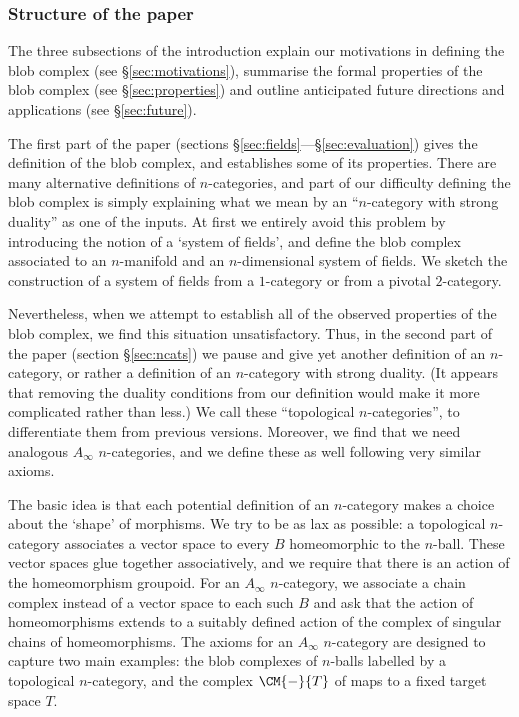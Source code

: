 \subsubsection{Structure of the paper}
The three subsections of the introduction explain our motivations in defining the blob complex (see \S \ref{sec:motivations}), summarise the formal properties of the blob complex (see \S \ref{sec:properties}) and outline anticipated future directions and applications (see \S \ref{sec:future}).

The first part of the paper (sections \S \ref{sec:fields}---\S \ref{sec:evaluation}) gives the definition of the blob complex, and establishes some of its properties. There are many alternative definitions of $n$-categories, and part of our difficulty defining the blob complex is simply explaining what we mean by an ``$n$-category with strong duality'' as one of the inputs. At first we entirely avoid this problem by introducing the notion of a `system of fields', and define the blob complex associated to an $n$-manifold and an $n$-dimensional system of fields. We sketch the construction of a system of fields from a $1$-category or from a pivotal $2$-category.

Nevertheless, when we attempt to establish all of the observed properties of the blob complex, we find this situation unsatisfactory. Thus, in the second part of the paper (section \S \ref{sec:ncats}) we pause and give yet another definition of an $n$-category, or rather a definition of an $n$-category with strong duality. (It appears that removing the duality conditions from our definition would make it more complicated rather than less.) We call these ``topological $n$-categories'', to differentiate them from previous versions. Moreover, we find that we need analogous $A_\infty$ $n$-categories, and we define these as well following very similar axioms.

The basic idea is that each potential definition of an $n$-category makes a choice about the `shape' of morphisms. We try to be as lax as possible: a topological $n$-category associates a vector space to every $B$ homeomorphic to the $n$-ball. These vector spaces glue together associatively, and we require that there is an action of the homeomorphism groupoid.
For an $A_\infty$ $n$-category, we associate a chain complex instead of a vector space to each such $B$ and ask that the action of homeomorphisms extends to a suitably defined action of the complex of singular chains of homeomorphisms. The axioms for an $A_\infty$ $n$-category are designed to capture two main examples: the blob complexes of $n$-balls labelled by a topological $n$-category, and the complex $\CM{-}{T}$ of maps to a fixed target space $T$.

